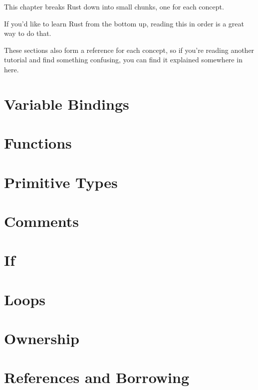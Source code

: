 This chapter breaks Rust down into small chunks, one for each concept.

\blank

If you'd like to learn Rust from the bottom up, reading this in order is a great way to do that.

\blank

These sections also form a reference for each concept, so if you're reading another tutorial and find something confusing, 
you can find it explained somewhere in here.

\section{Variable Bindings}
\label{sec:syntax_variableBindings}


\section{Functions}
\label{sec:syntax_functions}


\section{Primitive Types}
\label{sec:syntax_primitives}


\section{Comments}
\label{sec:syntax_comments}


\section{If}
\label{sec:syntax_if}


\section{Loops}
\label{sec:syntax_loops}


\section{Ownership}
\label{sec:syntax_ownership}


\section{References and Borrowing}
\label{sec:syntax_referencesBorrowing}


